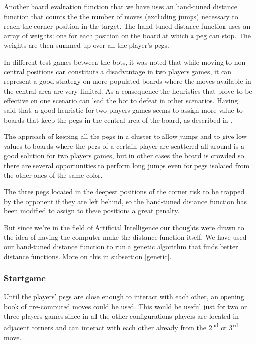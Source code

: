 \documentclass[a4paper,11pt]{article}
\begin{document}
Another board evaluation function that we have uses an hand-tuned
distance function that counts the the number of moves (excluding
jumps) necessary to reach the corner position in the target. The
hand-tuned distance function uses an array of weights: one for each
position on the board at which a peg can stop. The weights are then
summed up over all the player's pegs.

In different test games between the bots, it was noted that while moving to
non-central positions can constitute a disadvantage in two players games, it can
represent a good strategy on more populated boards where the moves available in
the central area are very limited. As a consequence the heuristics that prove to
be effective on one scenario can lead the bot to defeat in other scenarios.
Having said that, a good heuristic for two players games seems to assign more
value to boards that keep the pegs in the central area of the board, as
described in \cite{ulfhake}.

The approach of keeping all the pegs in a cluster to allow jumps and to give low
values to boards where the pegs of a certain player are scattered all around is
a good solution for two players games, but in other cases the board is crowded
so there are several opportunities to perform long jumps even for pegs isolated
from the other ones of the same color.

The three pegs located in the deepest positions of the corner risk to be trapped
by the opponent if they are left behind, so the hand-tuned distance function has
been modified to assign to these positions a great penalty.

But since we're in the field of Artificial Intelligence our thoughts
were drawn to the idea of having the computer make the distance
function itself. We have used our hand-tuned distance function to run
a genetic algorithm that finds better distance functions. More on this
in subsection \ref{genetic}.

\subsubsection{Startgame}
Until the players' pegs are close enough to interact with each other, an opening
book of pre-computed moves could be used. This would be useful just for two or
three players games since in all the other configurations players are located in
adjacent corners and can interact with each other already from the
 2\textsuperscript{nd} or 3\textsuperscript{rd} move.
\end{document}
